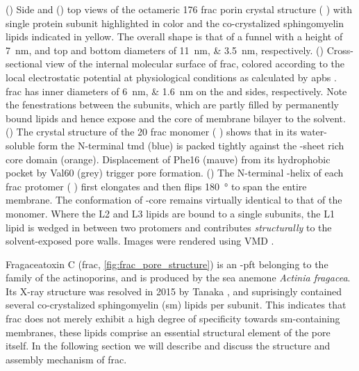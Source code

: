 \begin{figure*}[p]
{  %
  ()
  Side and 
  ()
  top views of the octameric \SI{176}{\kDa} \gls{frac} porin crystal structure (
  \cite{Tanaka-2015}) with single protein subunit highlighted in color and the co-crystalized sphingomyelin
  lipids indicated in yellow. The overall shape is that of a funnel with a height of \SI{7}{\nm}, and top and
  bottom diameters of \SIlist{11;3.5}{\nm}, respectively.
  ()
  Cross-sectional view of the internal molecular surface of \gls{frac}, colored according to the local
  electrostatic potential at physiological conditions as calculated by \gls{apbs}
  \cite{Baker-2001,Baker-2005}. \Gls{frac} has inner diameters of \SIlist{6;1.6}{\nm} on the \cisi{} and
  \transi{} sides, respectively. Note the fenestrations between the subunits, which are partly filled
  by permanently bound lipids and hence expose and the core of membrane bilayer to the solvent.
  ()
  The crystal structure of the \SI{20}{\kDa} \gls{frac} monomer ( \cite{Tanaka-2015}) shows that
  in its water-soluble form the N-terminal \gls{tmd} (blue) is packed tightly against the \tb-sheet rich core
  domain (orange). Displacement of Phe16 (mauve) from its hydrophobic pocket by Val60 (grey) trigger pore
  formation.
  ()
  The N-terminal \ta-helix of each \gls{frac} protomer ( \cite{Tanaka-2015}) first elongates and
  then flips \SI{180}{\degree} to span the entire membrane. The conformation of \tb-core remains virtually
  identical to that of the monomer. Where the L2 and L3 lipids are bound to a single subunits, the L1 lipid is
  wedged in between two protomers and contributes \emph{structurally} to the solvent-exposed pore walls.
  Images were rendered using VMD \cite{Humphrey-1996,Stone-1998}.}\label{fig:frac_pore_structure}
\end{figure*}

Fragaceatoxin C (\gls{frac}, \cref{fig:frac_pore_structure}) is an \ta-\gls{pft} belonging to the family of
the actinoporins, and is produced by the sea anemone \textit{Actinia fragacea}. Its X-ray structure was
resolved in 2015 by Tanaka \etal{} \cite{Tanaka-2015}, and suprisingly contained several co-crystalized
sphingomyelin (\gls{sm}) lipids per subunit. This indicates that \gls{frac} does not merely exhibit a high
degree of specificity towards \gls{sm}-containing membranes, these lipids comprise an essential structural
element of the pore itself. In the following section we will describe and discuss the structure and assembly
mechanism of \gls{frac}.

